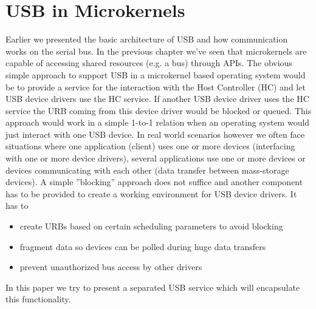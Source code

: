 \documentclass{acm_proc_article-sp}
\begin{document}
\section{USB in Microkernels}
\label{sec:both}
Earlier we presented the basic architecture of USB and how communication works on the serial bus.
In the previous chapter we've seen that microkernels are capable of accessing shared resources
(e.g. a bus) through APIs.
The obvious simple approach to support USB in a microkernel based operating system would be to provide
a service for the interaction with the Host Controller (HC) and let USB device drivers use the HC service.
If another USB device driver uses the HC service the URB coming from this device driver would be
blocked or queued.
This approach would work in a simple 1-to-1 relation when an operating system would just interact
with one USB device.
In real world scenarios however we often face situations where one application (client) uses one or more
devices (interfacing with one or more device drivers), several applications use one or more devices or
devices communicating with each other (data transfer between mass-storage devices).
A simple ''blocking'' approach does not suffice and another component has to be provided to create a working
environment for USB device drivers.
It has to
\begin{itemize}
\item create URBs based on certain scheduling parameters to avoid blocking
\item fragment data so devices can be polled during huge data transfers
\item prevent unauthorized bus access by other drivers
\end{itemize}
In this paper we try to present a separated USB service which will encapsulate this functionality.
\end{document}
